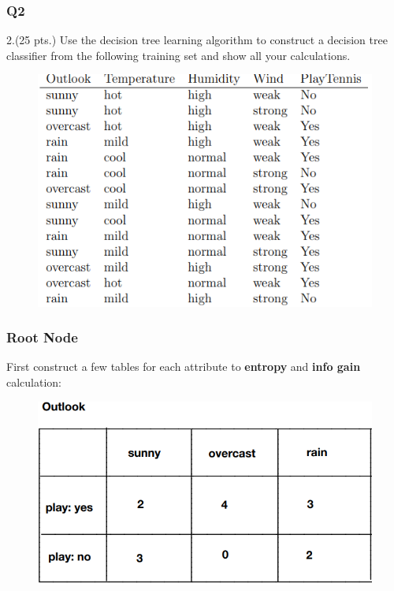 \documentclass[11pt]{article}
\makeatletter
\def\maxwidth{\ifdim\Gin@nat@width>\linewidth\linewidth
    \else\Gin@nat@width\fi}
\let\Oldincludegraphics\includegraphics
\renewcommand{\includegraphics}[1]{\Oldincludegraphics[width=.8\maxwidth]{#1}}
\makeatother
\begin{document}
    \subsubsection*{Q2}\label{q2}

    2.(25 pts.) Use the decision tree learning algorithm to construct a
decision tree classifier from the following training set and show all
your calculations.

\begin{figure}[H]
\centering
\includegraphics{1.png}
\caption{}
\end{figure}

    \subsubsection*{Root Node}\label{root-node}

    First construct a few tables for each attribute to \textbf{entropy} and
\textbf{info gain} calculation:

\begin{figure}[H]
\centering
\includegraphics{3.png}
\caption{}
\end{figure}
\end{document}
